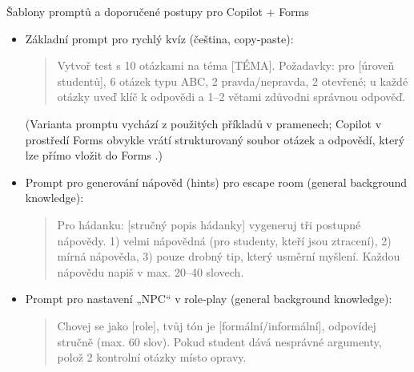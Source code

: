 Šablony promptů a doporučené postupy pro Copilot + Forms
\begin{itemize}
  \item Základní prompt pro rychlý kvíz (čeština, copy‑paste):
    \begin{quote}
      
\begin{PromptBlock}

Vytvoř test s 10 otázkami na téma [TÉMA]. Požadavky: pro [úroveň studentů], 6 otázek typu ABC, 2 pravda/nepravda, 2 otevřené; u každé otázky uveď klíč k odpovědi a 1–2 větami zdůvodni správnou odpověď.
\end{PromptBlock}

    \end{quote}
    (Varianta promptu vychází z použitých příkladů v pramenech; Copilot v prostředí Forms obvykle vrátí strukturovaný soubor otázek a odpovědí, který lze přímo vložit do Forms \cite{kb_ai_101_tipu_pdf_04e4a115_page_36_1}.)
  \item Prompt pro generování nápověd (hints) pro escape room (general background knowledge):
    \begin{quote}
      
\begin{PromptBlock}

Pro hádanku: [stručný popis hádanky] vygeneruj tři postupné nápovědy. 1) velmi nápovědná (pro studenty, kteří jsou ztracení), 2) mírná nápověda, 3) pouze drobný tip, který usměrní myšlení. Každou nápovědu napiš v max. 20–40 slovech.
\end{PromptBlock}

    \end{quote}
  \item Prompt pro nastavení „NPC“ v role‑play (general background knowledge):
    \begin{quote}
      
\begin{PromptBlock}

Chovej se jako [role], tvůj tón je [formální/informální], odpovídej stručně (max. 60 slov). Pokud student dává nesprávné argumenty, polož 2 kontrolní otázky místo opravy.
\end{PromptBlock}

    \end{quote}
\end{itemize}

